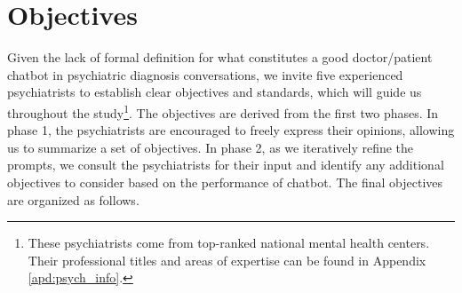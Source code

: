 \section{Objectives}
\label{sec:objectives}

Given the lack of formal definition for what constitutes a good doctor/patient chatbot in psychiatric diagnosis conversations, we invite five experienced psychiatrists to establish clear objectives and standards, which will guide us throughout the study\footnote{These psychiatrists come from top-ranked national mental health centers. 
Their professional titles and areas of expertise can be found in 
Appendix \ref{apd:psych_info}.}. 
The objectives are derived from the first two phases. In phase 1, the psychiatrists are encouraged to freely express their opinions, allowing us to summarize a set of objectives.  In phase 2, as we iteratively refine the prompts, we consult the psychiatrists for their input and identify any additional objectives to consider based on the performance of chatbot. The final objectives are organized as follows.


